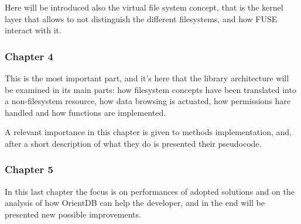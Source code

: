 Here will be introduced also the virtual file system concept, that is the kernel layer that allows to not distinguish the different filesystems, and how FUSE interact with it.

\subsubsection{Chapter 4}
This is the most important part, and it's here that the library architecture will be examined in its main parts: how filesystem concepts have been translated into a non-filesystem resource, how data browsing is actuated, how permissions hare handled and how functions are implemented.

A relevant importance in this chapter is given to methods implementation, and, after a short description of what they do is presented their pseudocode. 

\subsubsection{Chapter 5}
In this last chapter the focus is on performances of adopted solutions and on the analysis of how OrientDB can help the developer, and in the end will be presented new possible improvements.